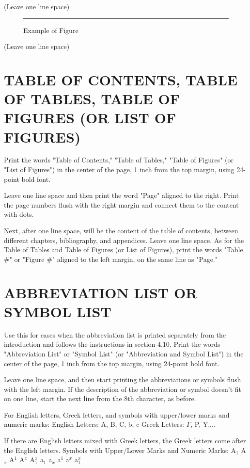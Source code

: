 (Leave one line space)

\begin{figure}[h]
\centering
\rule{6cm}{4cm} %
\caption{Example of Figure}
\label{fig:3.1}
\end{figure}

(Leave one line space)

\section{TABLE OF CONTENTS, TABLE OF TABLES, TABLE OF FIGURES (OR LIST OF FIGURES)}

Print the words "Table of Contents," "Table of Tables," "Table of Figures" (or "List of Figures") in the center of the page, 1 inch from the top margin, using 24-point bold font.

Leave one line space and then print the word "Page" aligned to the right. Print the page numbers flush with the right margin and connect them to the content with dots.

Next, after one line space, will be the content of the table of contents, between different chapters, bibliography, and appendices. Leave one line space. As for the Table of Tables and Table of Figures (or List of Figures), print the words "Table \#" or "Figure \#" aligned to the left margin, on the same line as "Page."

\section{ABBREVIATION LIST OR SYMBOL LIST}

Use this for cases when the abbreviation list is printed separately from the introduction and follows the instructions in section 4.10. Print the words "Abbreviation List" or "Symbol List" (or "Abbreviation and Symbol List") in the center of the page, 1 inch from the top margin, using 24-point bold font.

Leave one line space, and then start printing the abbreviations or symbols flush with the left margin. If the description of the abbreviation or symbol doesn't fit on one line, start the next line from the 8th character, as before.

For English letters, Greek letters, and symbols with upper/lower marks and numeric marks: English Letters: A, B, C, b, c Greek Letters: $\Gamma$, P, Y,...

If there are English letters mixed with Greek letters, the Greek letters come after the English letters. Symbols with Upper/Lower Marks and Numeric Marks: A$_1$ A$_x$ A$^1$ A$^x$ A$_1^x$ a$_1$ a$_x$ a$^1$ a$^x$ a$_1^x$

